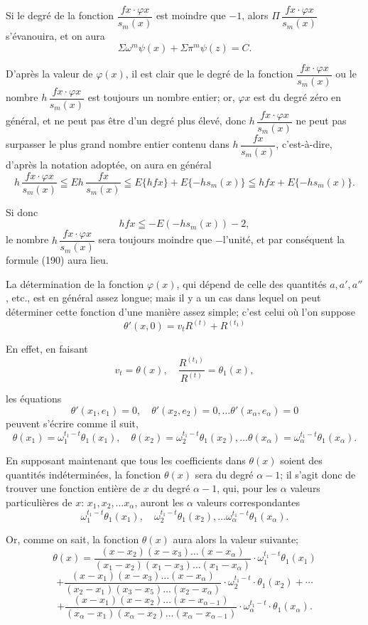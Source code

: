 \documentclass{article}
\begin{document}
Si le degré de la fonction $\dfrac{f x \cdot \varphi x}{s_m(x)}$ est moindre que $-1$, alors $\Pi\,\dfrac{f x \cdot \varphi x}{s_m(x)}$ s'évanouira, et on aura
\[ \Sigma\omega^{m}\psi(x)+\Sigma\pi^{m}\psi(z) = C. \tag{190} \]

D'après la valeur de $\varphi(x)$, il est clair que le degré de la fonction $\dfrac{f x \cdot \varphi x}{s_m(x)}$ ou le nombre $h\,\dfrac{f x \cdot \varphi x}{s_m(x)}$ est toujours un nombre entier; or, $\varphi x$ est du degré zéro en général, et ne peut pas être d'un degré
plus élevé, donc $h\,\dfrac{f x \cdot \varphi x}{s_m(x)}$ ne peut pas surpasser le plus grand nombre entier contenu dans $h\,\dfrac{f x}{s_m(x)}$, c'est-à-dire, d'après la notation adoptée, on aura en général
\[ h\,\frac{f x \cdot \varphi x}{s_m(x)} \leqq Eh\,\frac{f x}{s_m(x)} \leqq E\{hfx\}+E\{-hs_m(x)\} \leqq hfx+E\{-hs_m(x)\}. \]

Si donc
\[ hfx \leqq -E(-hs_m(x))-2, \tag{191} \]
le nombre $h\,\dfrac{f x \cdot \varphi x}{s_m(x)}$ sera toujours moindre que $-$l'unité, et par conséquent la formule (190) aura lieu.

La détermination de la fonction $\varphi(x)$, qui dépend de celle des quantités $a, a', a''$, etc., est en général assez longue; mais il y a un cas dans lequel on peut déterminer cette fonction d'une manière assez simple; c'est celui où l'on suppose
\[ \theta'(x,0) = v_t R^{(t)} + R^{(t_1)} \tag{192} \]

En effet, en faisant
\[ v_t = \theta(x), \quad \frac{R^{(t_1)}}{R^{(t)}} = \theta_1(x), \tag{193} \]

les équations
\[ \theta'(x_1,e_1) = 0, \quad \theta'(x_2,e_2) = 0, \ldots \theta'(x_\alpha,e_\alpha) = 0 \]
peuvent s'écrire comme il suit,
\[ \theta(x_1) = \omega_1^{t_1-t}\theta_1(x_1), \quad \theta(x_2) = \omega_2^{t_1-t}\theta_1(x_2), \ldots \theta(x_\alpha) = \omega_\alpha^{t_1-t}\theta_1(x_\alpha). \tag{194} \]

En supposant maintenant que tous les coefficients dans $\theta(x)$ soient des quantités indéterminées, la fonction $\theta(x)$ sera du degré
$\alpha-1$; il s'agit donc de trouver une fonction entière de $x$ du degré $\alpha-1$, qui, pour les $\alpha$ valeurs particulières de $x$: $x_1, x_2, \ldots x_\alpha$, auront les $\alpha$ valeurs correspondantes
\[ \omega_1^{t_1-t}\theta_1(x_1), \quad \omega_2^{t_1-t}\theta_1(x_2), \ldots \omega_\alpha^{t_1-t}\theta_1(x_\alpha). \]

Or, comme on sait, la fonction $\theta(x)$ aura alors la valeur suivante;
\[ \theta(x) = \frac{(x-x_2)(x-x_3)\ldots(x-x_\alpha)}{(x_1-x_2)(x_1-x_3)\ldots(x_1-x_\alpha)} \cdot \omega_1^{t_1-t}\theta_1(x_1) \]
\[ + \frac{(x-x_1)(x-x_3)\ldots(x-x_\alpha)}{(x_2-x_1)(x_3-x_5)\ldots(x_2-x_\alpha)} \cdot \omega_2^{t_1-t} \cdot \theta_1(x_2) + \cdots \tag{195} \]
\[ + \frac{(x-x_1)(x-x_2)\ldots(x-x_{\alpha-1})}{(x_\alpha-x_1)(x_\alpha-x_2)\ldots(x_\alpha-x_{\alpha-1})} \cdot \omega_\alpha^{t_1-t} \cdot \theta_1(x_\alpha). \]
\end{document}
